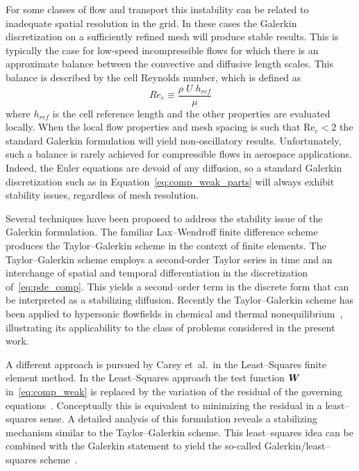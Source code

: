 For some classes of flow and transport this instability can be related to inadequate spatial resolution in the grid.  In these cases the Galerkin discretization on a sufficiently refined mesh will produce stable results.  This is typically the case for low-speed incompressible flows for which there is an approximate balance between the convective and diffusive length scales.  This balance is described by the cell Reynolds number, which is defined as
\begin{equation}
  Re_c \equiv \frac{\rho\; U\; h_{ref}}{\mu}
  \label{eq:peclet}
\end{equation}
where $h_{ref}$ is the cell reference length and the other properties are evaluated locally.  When the local flow properties and mesh spacing is such that Re$_c < 2$ the standard Galerkin formulation will yield non-oscillatory results.  Unfortunately, such a balance is rarely achieved for compressible flows in aerospace applications.  Indeed, the Euler equations are devoid of any diffusion, so a standard Galerkin discretization such as in Equation~\eqref{eq:comp_weak_parts} will always exhibit stability issues, regardless of mesh resolution.

Several techniques have been proposed to address the stability issue of the Galerkin formulation.  The familiar Lax--Wendroff finite difference scheme produces the Taylor--Galerkin scheme in the context of finite elements.  The Taylor--Galerkin scheme employs a second-order Taylor series in time and an interchange of spatial and temporal differentiation in the discretization of~\eqref{eq:pde_comp}. This yields a second--order term in the discrete form that can be interpreted as a stabilizing diffusion.  Recently the Taylor--Galerkin scheme has been applied to hypersonic flowfields in chemical and thermal nonequilibrium~\cite{hypersonic_taylor_galerkin}, illustrating its applicability to the class of problems considered in the present work.

A different approach is pursued by Carey et~al.\ in the Least--Squares finite element method. In the Least--Squares approach the test function ${\boldsymbol{W}}$ in~\eqref{eq:comp_weak} is replaced by the variation of the residual of the governing equations~\cite{carey_jiang,carey_jiang_euler}.  Conceptually this is equivalent to minimizing the residual in a least--squares sense.  A detailed analysis of this formulation reveals a stabilizing mechanism similar to the Taylor--Galerkin scheme.  This least--squares idea can be combined with the Galerkin statement to yield the so-called Galerkin/least--squares scheme~\cite{hughes_franca_hullbert_GLS}.


